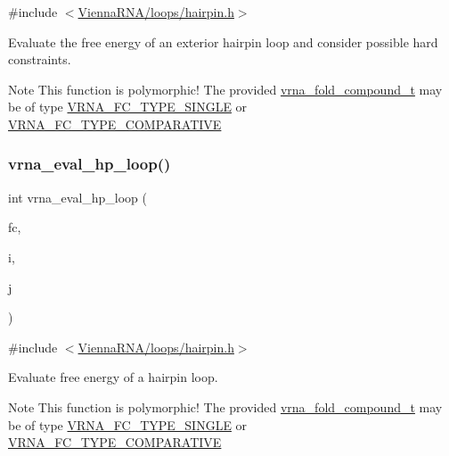 {\ttfamily \#include $<$\hyperlink{hairpin_8h}{Vienna\+R\+N\+A/loops/hairpin.\+h}$>$}



Evaluate the free energy of an exterior hairpin loop and consider possible hard constraints. 

\begin{DoxyNote}{Note}
This function is polymorphic! The provided \hyperlink{group__fold__compound_ga1b0cef17fd40466cef5968eaeeff6166}{vrna\+\_\+fold\+\_\+compound\+\_\+t} may be of type \hyperlink{group__fold__compound_gga01a4ff86fa71deaaa5d1abbd95a1447da7e264dd3cf2dc9b6448caabcb7763cd6}{V\+R\+N\+A\+\_\+\+F\+C\+\_\+\+T\+Y\+P\+E\+\_\+\+S\+I\+N\+G\+LE} or \hyperlink{group__fold__compound_gga01a4ff86fa71deaaa5d1abbd95a1447dab821ce46ea3cf665be97df22a76f5023}{V\+R\+N\+A\+\_\+\+F\+C\+\_\+\+T\+Y\+P\+E\+\_\+\+C\+O\+M\+P\+A\+R\+A\+T\+I\+VE} 
\end{DoxyNote}
\mbox{\label{group__eval__loops__hp_gad0bb844f8dc704c71737ae1d7e32b975}} 
\subsubsection{\texorpdfstring{vrna\+\_\+eval\+\_\+hp\+\_\+loop()}{vrna\_eval\_hp\_loop()}}
{\footnotesize\ttfamily int vrna\+\_\+eval\+\_\+hp\+\_\+loop (\begin{DoxyParamCaption}\item[{\hyperlink{group__fold__compound_ga1b0cef17fd40466cef5968eaeeff6166}{vrna\+\_\+fold\+\_\+compound\+\_\+t} $\ast$}]{fc,  }\item[{int}]{i,  }\item[{int}]{j }\end{DoxyParamCaption})}



{\ttfamily \#include $<$\hyperlink{hairpin_8h}{Vienna\+R\+N\+A/loops/hairpin.\+h}$>$}



Evaluate free energy of a hairpin loop. 

\begin{DoxyNote}{Note}
This function is polymorphic! The provided \hyperlink{group__fold__compound_ga1b0cef17fd40466cef5968eaeeff6166}{vrna\+\_\+fold\+\_\+compound\+\_\+t} may be of type \hyperlink{group__fold__compound_gga01a4ff86fa71deaaa5d1abbd95a1447da7e264dd3cf2dc9b6448caabcb7763cd6}{V\+R\+N\+A\+\_\+\+F\+C\+\_\+\+T\+Y\+P\+E\+\_\+\+S\+I\+N\+G\+LE} or \hyperlink{group__fold__compound_gga01a4ff86fa71deaaa5d1abbd95a1447dab821ce46ea3cf665be97df22a76f5023}{V\+R\+N\+A\+\_\+\+F\+C\+\_\+\+T\+Y\+P\+E\+\_\+\+C\+O\+M\+P\+A\+R\+A\+T\+I\+VE}
\end{DoxyNote}

